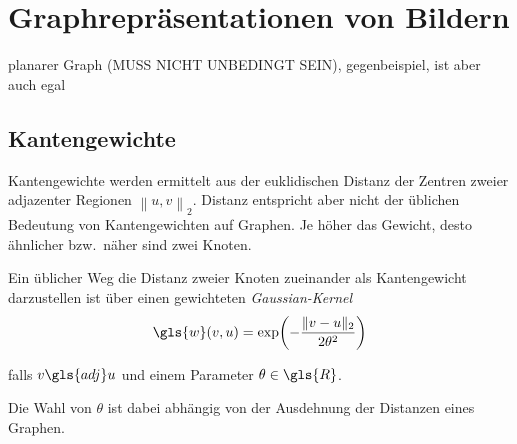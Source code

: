 \chapter{Graphrepräsentationen von Bildern}

planarer Graph (MUSS NICHT UNBEDINGT SEIN), gegenbeispiel, ist aber auch egal

\section{Kantengewichte}

Kantengewichte werden ermittelt aus der euklidischen Distanz der Zentren zweier adjazenter Regionen $\left\|u, v\right\|_2$.
Distanz entspricht aber nicht der üblichen Bedeutung von Kantengewichten auf Graphen.
Je höher das Gewicht, desto ähnlicher bzw.\ näher sind zwei Knoten.

Ein üblicher Weg die Distanz zweier Knoten zueinander als Kantengewicht darzustellen ist über einen gewichteten \emph{Gaussian-Kernel}~\cite{Shuman}
\begin{equation}
  \gls{w}\left(v, u\right) = \exp\left(-\frac{\left\|v - u\right\|_2}{2\theta^2}\right)
\end{equation}

falls $v \gls{adj} u$ und einem Parameter $\theta \in \gls{R}$.

Die Wahl von $\theta$ ist dabei abhängig von der Ausdehnung der Distanzen eines Graphen.

\begin{center}
\end{center}
